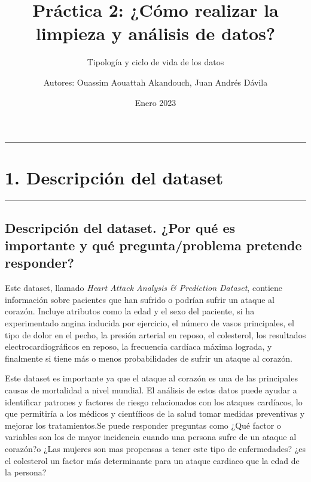 \documentclass[
]{article}
\title{Práctica 2: ¿Cómo realizar la limpieza y análisis de datos?}
\subtitle{Tipología y ciclo de vida de los datos}
\author{Autores: Ouassim Aouattah Akandouch, Juan Andrés Dávila}
\date{Enero 2023}
\begin{document}
\maketitle

{
\setcounter{tocdepth}{2}
\tableofcontents
}
\begin{center}\rule{0.5\linewidth}{0.5pt}\end{center}

\hypertarget{descripciuxf3n-del-dataset}{%
\section{1. Descripción del dataset}\label{descripciuxf3n-del-dataset}}

\begin{center}\rule{0.5\linewidth}{0.5pt}\end{center}

\hypertarget{descripciuxf3n-del-dataset.-por-quuxe9-es-importante-y-quuxe9-preguntaproblema-pretende-responder}{%
\subsection{Descripción del dataset. ¿Por qué es importante y qué
pregunta/problema pretende
responder?}\label{descripciuxf3n-del-dataset.-por-quuxe9-es-importante-y-quuxe9-preguntaproblema-pretende-responder}}

Este dataset, llamado \emph{Heart Attack Analysis \& Prediction
Dataset}, contiene información sobre pacientes que han sufrido o podrían
sufrir un ataque al corazón. Incluye atributos como la edad y el sexo
del paciente, si ha experimentado angina inducida por ejercicio, el
número de vasos principales, el tipo de dolor en el pecho, la presión
arterial en reposo, el colesterol, los resultados electrocardiográficos
en reposo, la frecuencia cardíaca máxima lograda, y finalmente si tiene
más o menos probabilidades de sufrir un ataque al corazón.

Este dataset es importante ya que el ataque al corazón es una de las
principales causas de mortalidad a nivel mundial. El análisis de estos
datos puede ayudar a identificar patrones y factores de riesgo
relacionados con los ataques cardíacos, lo que permitiría a los médicos
y científicos de la salud tomar medidas preventivas y mejorar los
tratamientos.Se puede responder preguntas como ¿Qué factor o variables
son los de mayor incidencia cuando una persona sufre de un ataque al
corazón?o ¿Las mujeres son mas propensas a tener este tipo de
enfermedades? ¿es el colesterol un factor más determinante para un
ataque cardiaco que la edad de la persona?
\end{document}

